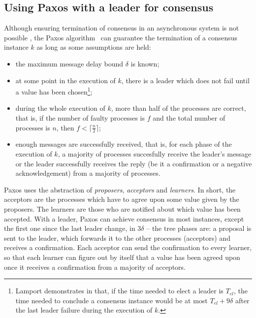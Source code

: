 \documentclass[times, 10pt]{article}
\begin{document}
\subsection{Using Paxos with a leader for consensus}
\label{sec:paxos}

Although ensuring termination of consensus in an asynchronous system is not possible \cite{fischer1985idc}, the Paxos algorithm~\cite{lamport1998ptp} can guarantee the termination of a consensus instance $k$ as long as some assumptions are held:

\begin{itemize}
  \item the maximum message delay bound $\delta$ is known;
  \item at some point in the execution of $k$, there is a leader which does not fail until a value has been chosen\footnote{Lamport demonstrates in \cite{lamport1998ptp} that, if the time needed to elect a leader is $T_{el}$, the time needed to conclude a consensus instance would be at most $T_{el} + 9\delta$ after the last leader failure during the execution of $k$.};
  \item during the whole execution of $k$, more than half of the processes are correct, that is, if the number of faulty processes is $f$ and the total number of processes is $n$, then $f < \lceil \frac{n}{2} \rceil$;
  \item enough messages are successfully received, that is, for each phase of the execution of $k$, a majority of processes succesfully receive the leader's message or the leader successfully receives the reply (be it a confirmation or a negative acknowledgement) from a majority of processes.
\end{itemize}

Paxos uses the abstraction of \emph{proposers}, \emph{acceptors} and \emph{learners}. In short, the acceptors are the processes which have to agree upon some value given by the proposers. The learners are those who are notified about which value has been accepted. With a leader, Paxos can achieve consensus in most instances, except the first one since the last leader change, in $3\delta$ -- the tree phases are: a proposal is sent to the leader, which forwards it to the other processes (acceptors) and receives a confirmation. Each acceptor can send the confirmation to every learner, so that each learner can figure out by itself that a value has been agreed upon once it receives a confirmation from a majority of acceptors.
\end{document}
